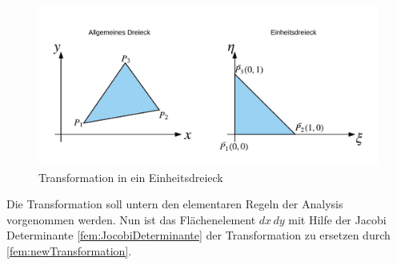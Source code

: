 \begin{figure}[h!]
	\centering
	\includegraphics[scale=0.8]{papers/fem/Images/Dreiecke.jpeg}
	\caption{Transformation in ein Einheitsdreieck}
	\label{fig:schemNMR_vorlage}
\end{figure}
Die Transformation soll untern den elementaren Regeln der Analysis vorgenommen werden. Nun ist das Flächenelement $dx \, dy$ mit Hilfe der Jacobi Determinante \eqref{fem:JocobiDeterminante} der Transformation zu ersetzen durch \eqref{fem:newTransformation}.

